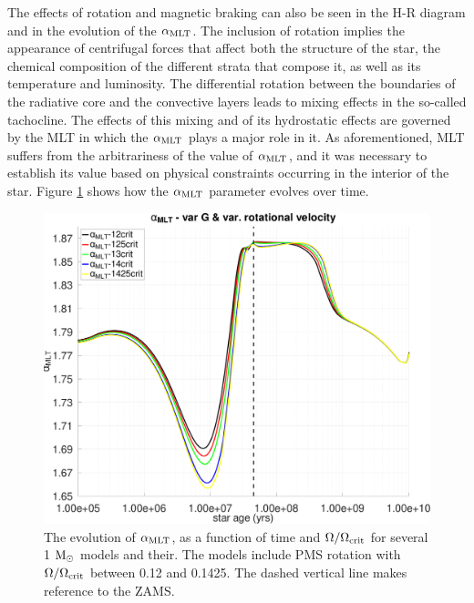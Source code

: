\documentclass[fleqn,usenatbib]{mnras}
\begin{document}
\begin{ceqn}
The effects of rotation and magnetic braking can also be seen in the H-R diagram and in the evolution of the $\alpha_{\mathrm{MLT}}$. The inclusion of rotation implies the appearance of centrifugal forces that affect both the structure of the star, the chemical composition of the different strata that compose it, as well as its temperature and luminosity. The differential rotation between the boundaries of the radiative core and the convective layers leads to mixing effects in the so-called tachocline. The effects of this mixing and of its hydrostatic effects are governed by the MLT in which the $\alpha_{\mathrm{MLT}}$ plays a major role in it. As aforementioned, MLT suffers from the arbitrariness of the value of $\alpha_{\mathrm{MLT}}$, and it was necessary to establish its value based on physical constraints occurring in the interior of the star. Figure \ref{fig:alpha_mlt_var_vel_g3} shows how the $\alpha_{\mathrm{MLT}}$ parameter evolves over time.\par 

\begin{figure}
	\includegraphics[clip,width=\columnwidth]{figures/paper2/alpha_mlt_var_vel_g3.pdf}
    \caption{The evolution of $\alpha_{\mathrm{MLT}}$, as a function of time and $\Omega / \Omega_{\mathrm{crit}}$ for several 1 $\mathrm{M}_\odot$ models and their. The models include PMS rotation with $\Omega / \Omega_{\mathrm{crit}}$ between 0.12 and 0.1425. The dashed vertical line makes reference to the ZAMS.}
    \label{fig:alpha_mlt_var_vel_g3}
\end{figure}


\end{ceqn}
\end{document}
